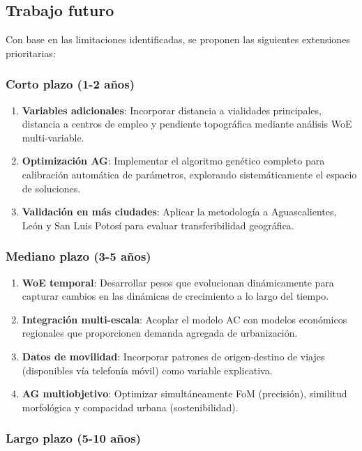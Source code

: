 \subsection{Trabajo futuro}

Con base en las limitaciones identificadas, se proponen las siguientes extensiones prioritarias:

\subsubsection{Corto plazo (1-2 años)}

\begin{enumerate}
	\item \textbf{Variables adicionales}: Incorporar distancia a vialidades principales, distancia a centros de empleo y pendiente topográfica mediante análisis WoE multi-variable.
	\item \textbf{Optimización AG}: Implementar el algoritmo genético completo para calibración automática de parámetros, explorando sistemáticamente el espacio de soluciones.
	\item \textbf{Validación en más ciudades}: Aplicar la metodología a Aguascalientes, León y San Luis Potosí para evaluar transferibilidad geográfica.
\end{enumerate}

\subsubsection{Mediano plazo (3-5 años)}

\begin{enumerate}
	\item \textbf{WoE temporal}: Desarrollar pesos que evolucionan dinámicamente para capturar cambios en las dinámicas de crecimiento a lo largo del tiempo.
	\item \textbf{Integración multi-escala}: Acoplar el modelo AC con modelos económicos regionales que proporcionen demanda agregada de urbanización.
	\item \textbf{Datos de movilidad}: Incorporar patrones de origen-destino de viajes (disponibles vía telefonía móvil) como variable explicativa.
	\item \textbf{AG multiobjetivo}: Optimizar simultáneamente FoM (precisión), similitud morfológica y compacidad urbana (sostenibilidad).
\end{enumerate}

\subsubsection{Largo plazo (5-10 años)}

